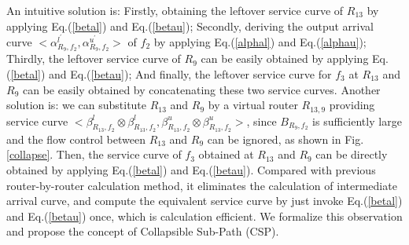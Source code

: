 \documentclass[10pt,journal]{IEEEtran}
\begin{document}
An intuitive solution is: Firstly, obtaining the leftover service curve of $R_{13}$ by applying Eq.(\ref{betal}) and Eq.(\ref{betau}); Secondly, deriving the output arrival curve $<\alpha_{R_{9},f_2}^{l^\prime},\alpha_{R_{9},f_2}^{u^\prime}>$ of $f_2$ by applying Eq.(\ref{alphal}) and Eq.(\ref{alphau}); Thirdly, the leftover service curve of $R_9$ can be easily obtained by applying Eq.(\ref{betal}) and Eq.(\ref{betau}); And finally, the leftover service curve for $f_3$ at $R_{13}$ and $R_9$ can be easily obtained by concatenating these two service curves. Another solution is: we can substitute $R_{13}$ and $R_{9}$ by a virtual router $R_{13,9}$ providing service curve $<\beta_{R_{13},f_2}^l\otimes\beta_{R_{13},f_2}^l,\beta_{R_{13},f_2}^u\otimes\beta_{R_{13},f_2}^u>$, since $B_{R_9,f_2}$ is sufficiently large and the flow control between $R_{13}$ and $R_9$ can be ignored, as shown in Fig. \ref{collapse}. Then, the service curve of $f_3$ obtained at $R_{13}$ and $R_{9}$ can be directly obtained by applying Eq.(\ref{betal}) and Eq.(\ref{betau}). Compared with previous router-by-router calculation method, it eliminates the calculation of intermediate arrival curve, and compute the equivalent service curve by just invoke Eq.(\ref{betal}) and Eq.(\ref{betau}) once, which is calculation efficient. We formalize this observation and propose the concept of Collapsible Sub-Path (CSP).
\end{document}
